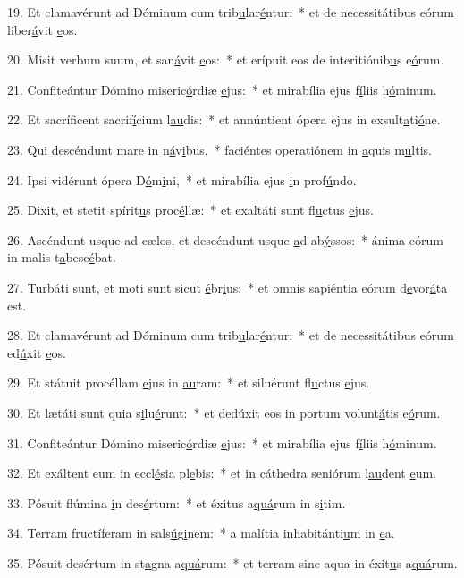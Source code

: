 19. Et clamavérunt ad Dóminum cum trib\uline{u}lar\uline{é}ntur:~* et de necessitátibus eórum liber\uline{á}vit \uline{e}os.\par 
20. Misit verbum suum, et san\uline{á}vit \uline{e}os:~* et erípuit eos de interitiónib\uline{u}s e\uline{ó}rum.\par 
21. Confiteántur Dómino miseric\uline{ó}rdiæ \uline{e}jus:~* et mirabília ejus f\uline{í}liis h\uline{ó}minum.\par 
22. Et sacríficent sacrif\uline{í}cium l\uline{au}dis:~* et annúntient ópera ejus in exsult\uline{a}ti\uline{ó}ne.\par 
23. Qui descéndunt mare in n\uline{á}v\uline{i}bus,~* faciéntes operatiónem in \uline{a}quis m\uline{u}ltis.\par 
24. Ipsi vidérunt ópera D\uline{ó}m\uline{i}ni,~* et mirabília ejus \uline{i}n prof\uline{ú}ndo.\par 
25. Dixit, et stetit spírit\uline{u}s proc\uline{é}llæ:~* et exaltáti sunt fl\uline{u}ctus \uline{e}jus.\par 
26. Ascéndunt usque ad cælos, et descéndunt usque \uline{a}d ab\uline{ý}ssos:~* ánima eórum in malis t\uline{a}besc\uline{é}bat.\par 
27. Turbáti sunt, et moti sunt sicut \uline{é}br\uline{i}us:~* et omnis sapiéntia eórum d\uline{e}vor\uline{á}ta est.\par 
28. Et clamavérunt ad Dóminum cum trib\uline{u}lar\uline{é}ntur:~* et de necessitátibus eórum ed\uline{ú}xit \uline{e}os.\par 
29. Et státuit procéllam \uline{e}jus in \uline{au}ram:~* et siluérunt fl\uline{u}ctus \uline{e}jus.\par 
30. Et lætáti sunt quia s\uline{i}lu\uline{é}runt:~* et dedúxit eos in portum volunt\uline{á}tis e\uline{ó}rum.\par 
31. Confiteántur Dómino miseric\uline{ó}rdiæ \uline{e}jus:~* et mirabília ejus f\uline{í}liis h\uline{ó}minum.\par 
32. Et exáltent eum in eccl\uline{é}sia pl\uline{e}bis:~* et in cáthedra seniórum l\uline{au}dent \uline{e}um.\par 
33. Pósuit flúmina \uline{i}n des\uline{é}rtum:~* et éxitus a\uline{quá}rum in s\uline{i}tim.\par 
34. Terram fructíferam in sals\uline{ú}g\uline{i}nem:~* a malítia inhabitánti\uline{u}m in \uline{e}a.\par 
35. Pósuit desértum in st\uline{a}gna a\uline{quá}rum:~* et terram sine aqua in éxit\uline{u}s a\uline{quá}rum.\par 
